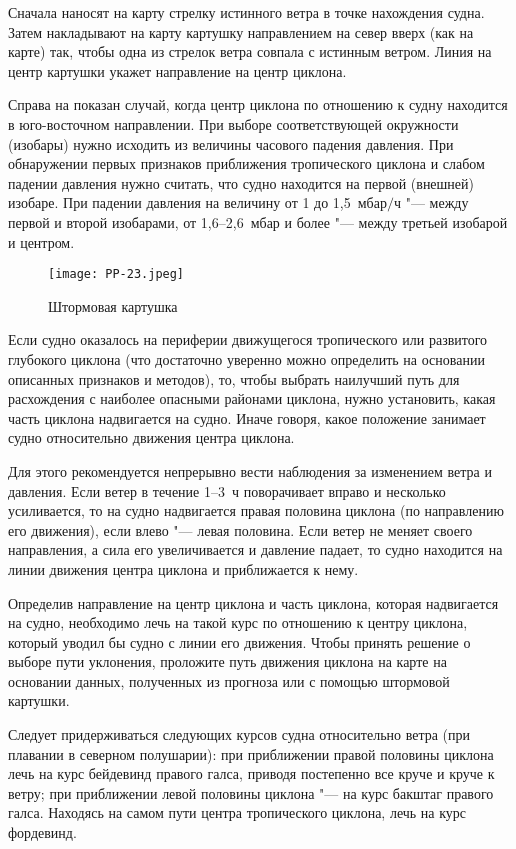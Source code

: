 Сначала наносят на карту стрелку истинного ветра в точке нахождения
судна. Затем накладывают на карту картушку направлением на север вверх
(как на карте) так, чтобы одна из стрелок ветра совпала с истинным
ветром. Линия на центр картушки укажет направление на центр циклона.

Справа на  показан случай, когда центр циклона по отношению
к судну находится в юго-восточном направлении. При выборе
соответствующей окружности (изобары) нужно исходить из величины
часового падения давления. При обнаружении первых признаков
приближения тропического циклона и слабом падении давления нужно
считать, что судно находится на первой (внешней) изобаре. При падении
давления на величину от 1 до 1,5~мбар$/$ч "--- между первой и второй
изобарами, от 1,6--2,6~мбар и более "--- между третьей изобарой и
центром.

\begin{figure}[htb]
  \centering{}
  \texttt{[image: PP-23.jpeg]}
  \caption{Штормовая картушка}
  \label{fig:pp23}
  \small
  \centering{}
\end{figure}

Если судно оказалось на периферии движущегося тропического или
развитого глубокого циклона (что достаточно уверенно можно определить
на основании описанных признаков и методов), то, чтобы выбрать
наилучший путь для расхождения с наиболее опасными районами циклона,
нужно установить, какая часть циклона надвигается на судно. Иначе
говоря, какое положение занимает судно относительно движения центра
циклона.

Для этого рекомендуется непрерывно вести наблюдения за изменением
ветра и давления. Если ветер в течение 1--3~ч поворачивает вправо и
несколько усиливается, то на судно надвигается правая половина циклона
(по направлению его движения), если влево "--- левая половина. Если ветер
не меняет своего направления, а сила его увеличивается и давление
падает, то судно находится на линии движения центра циклона и
приближается к нему.

Определив направление на центр циклона и часть циклона, которая
надвигается на судно, необходимо лечь на такой курс по отношению к
центру циклона, который уводил бы судно с линии его движения. Чтобы
принять решение о выборе пути уклонения, проложите путь движения
циклона на карте на основании данных, полученных из прогноза или с
помощью штормовой картушки.

Следует придерживаться следующих курсов судна относительно ветра (при
плавании в северном полушарии): при приближении правой половины
циклона лечь на курс бейдевинд правого галса, приводя постепенно все
круче и круче к ветру; при приближении левой половины циклона "--- на курс
бакштаг правого галса. Находясь на самом пути центра тропического
циклона, лечь на курс фордевинд.

